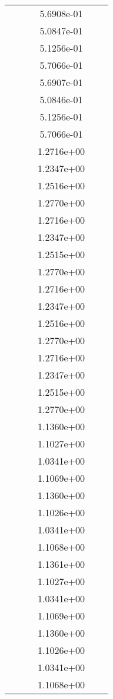 \begin{xltabular}{\textwidth}{r|rS[table-format=1.3e+2]S[table-format=1.4e+2]S[table-format=1.4e+2]S[table-format=-1.5]}
&  &  & 5.6908e-01 & & \\
&  &  & 5.0847e-01 & & \\
&  &  & 5.1256e-01 & & \\
&  &  & 5.7066e-01 & & \\
&  &  & 5.6907e-01 & & \\
&  &  & 5.0846e-01 & & \\
&  &  & 5.1256e-01 & & \\
&  &  & 5.7066e-01 & & \\
&  &  & 1.2716e+00 & & \\
&  &  & 1.2347e+00 & & \\
&  &  & 1.2516e+00 & & \\
&  &  & 1.2770e+00 & & \\
&  &  & 1.2716e+00 & & \\
&  &  & 1.2347e+00 & & \\
&  &  & 1.2515e+00 & & \\
&  &  & 1.2770e+00 & & \\
&  &  & 1.2716e+00 & & \\
&  &  & 1.2347e+00 & & \\
&  &  & 1.2516e+00 & & \\
&  &  & 1.2770e+00 & & \\
&  &  & 1.2716e+00 & & \\
&  &  & 1.2347e+00 & & \\
&  &  & 1.2515e+00 & & \\
&  &  & 1.2770e+00 & & \\
&  &  & 1.1360e+00 & & \\
&  &  & 1.1027e+00 & & \\
&  &  & 1.0341e+00 & & \\
&  &  & 1.1069e+00 & & \\
&  &  & 1.1360e+00 & & \\
&  &  & 1.1026e+00 & & \\
&  &  & 1.0341e+00 & & \\
&  &  & 1.1068e+00 & & \\
&  &  & 1.1361e+00 & & \\
&  &  & 1.1027e+00 & & \\
&  &  & 1.0341e+00 & & \\
&  &  & 1.1069e+00 & & \\
&  &  & 1.1360e+00 & & \\
&  &  & 1.1026e+00 & & \\
&  &  & 1.0341e+00 & & \\
&  &  & 1.1068e+00 & & \\

\end{xltabular}
